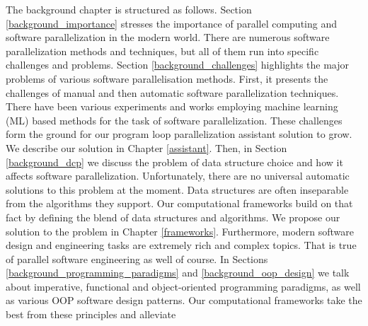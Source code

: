 % 
%
\quad The background chapter is structured as follows. Section \ref{background_importance} stresses the importance of parallel computing and software parallelization in the modern world. There are numerous software parallelization methods and techniques, but all of them run into specific challenges and problems. Section \ref{background_challenges} highlights the major problems of various software parallelisation methods. First, it presents the challenges of manual and then automatic software parallelization techniques. There have been various experiments and works employing machine learning (ML) based methods \cite{ml-oboyle} for the task of software parallelization. These challenges form the ground for our program loop parallelization assistant solution \cite{assistant-aiseps} to grow. We describe our solution in Chapter \ref{assistant}. Then, in Section \ref{background_dcp} we discuss the problem of data structure choice and how it affects software parallelization. Unfortunately, there are no universal automatic solutions to this problem at the moment. Data structures are often inseparable from the algorithms they support. Our computational frameworks build on that fact by defining the blend of data structures and algorithms. We propose our solution to the problem in Chapter \ref{frameworks}. Furthermore, modern software design and engineering tasks are extremely rich and complex topics. That is true of parallel software engineering as well of course. In Sections \ref{background_programming_paradigms} and \ref{background_oop_design} we talk about imperative, functional and object-oriented programming paradigms, as well as various OOP software design patterns. Our computational frameworks take the best from these principles and alleviate


